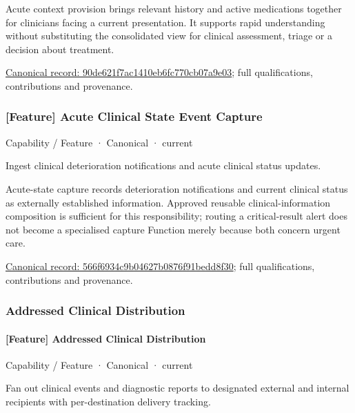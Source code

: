 Acute context provision brings relevant history and active medications together for clinicians facing a current presentation. It supports rapid understanding without substituting the consolidated view for clinical assessment, triage or a decision about treatment.


{\footnotesize \href{../../../../continuum/strategy/capability/feature/90de621f7ac1410eb6fc770cb07a9e03.md}{Canonical record: 90de621f7ac1410eb6fc770cb07a9e03}; full qualifications, contributions and provenance.}\par
\subsubsection{[Feature] Acute Clinical State Event Capture}

\label{element:566f6934c9b04627b0876f91bedd8f30}
{\small Capability / Feature · Canonical · current}\par

Ingest clinical deterioration notifications and acute clinical status updates.



Acute-state capture records deterioration notifications and current clinical status as externally established information. Approved reusable clinical-information composition is sufficient for this responsibility; routing a critical-result alert does not become a specialised capture Function merely because both concern urgent care.


{\footnotesize \href{../../../../continuum/strategy/capability/feature/566f6934c9b04627b0876f91bedd8f30.md}{Canonical record: 566f6934c9b04627b0876f91bedd8f30}; full qualifications, contributions and provenance.}\par
\subsubsection{Addressed Clinical Distribution}

\paragraph{[Feature] Addressed Clinical Distribution}

\label{element:b476c86edab644c394da33d3de7bd0bd}
{\small Capability / Feature · Canonical · current}\par

Fan out clinical events and diagnostic reports to designated external and internal recipients with per-destination delivery tracking.



